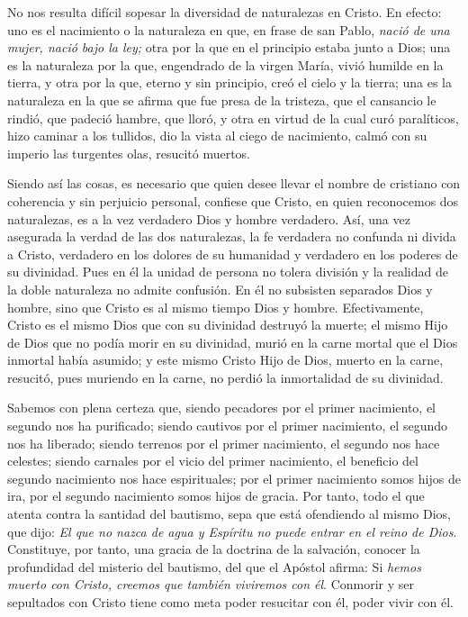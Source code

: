 				\begin{body}
					No nos resulta difícil sopesar la diversidad de naturalezas en Cristo. En efecto: uno es el nacimiento o la naturaleza en que, en frase de san Pablo, \emph{nació de una mujer, nació bajo la ley;} otra por la que en el principio estaba junto a Dios; una es la naturaleza por la que, engendrado de la virgen María, vivió humilde en la tierra, y otra por la que, eterno y sin principio, creó el cielo y la tierra; una es la naturaleza en la que se afirma que fue presa de la tristeza, que el cansancio le rindió, que padeció hambre, que lloró, y otra en virtud de la cual curó paralíticos, hizo caminar a los tullidos, dio la vista al ciego de nacimiento, calmó con su imperio las turgentes olas, resucitó muertos.
							
					Siendo así las cosas, es necesario que quien desee llevar el nombre de cristiano con coherencia y sin perjuicio personal, confiese que Cristo, en quien reconocemos dos naturalezas, es a la vez verdadero Dios y hombre verdadero. Así, una vez asegurada la verdad de las dos naturalezas, la fe verdadera no confunda ni divida a Cristo, verdadero en los dolores de su humanidad y verdadero en los poderes de su divinidad. Pues en él la unidad de persona no tolera división y la realidad de la doble naturaleza no admite confusión. En él no subsisten separados Dios y hombre, sino que Cristo es al mismo tiempo Dios y hombre. Efectivamente, Cristo es el mismo Dios que con su divinidad destruyó la muerte; el mismo Hijo de Dios que no podía morir en su divinidad, murió en la carne mortal que el Dios inmortal había asumido; y este mismo Cristo Hijo de Dios, muerto en la carne, resucitó, pues muriendo en la carne, no perdió la inmortalidad de su divinidad.
							
					Sabemos con plena certeza que, siendo pecadores por el primer nacimiento, el segundo nos ha purificado; siendo cautivos por el primer nacimiento, el segundo nos ha liberado; siendo terrenos por el primer nacimiento, el segundo nos hace celestes; siendo carnales por el vicio del primer nacimiento, el beneficio del segundo nacimiento nos hace espirituales; por el primer nacimiento somos hijos de ira, por el segundo nacimiento somos hijos de gracia. Por tanto, todo el que atenta contra la santidad del bautismo, sepa que está ofendiendo al mismo Dios, que dijo: \emph{El que no nazca de agua y Espíritu no puede entrar en el reino de Dios}. Constituye, por tanto, una gracia de la doctrina de la salvación, conocer la profundidad del misterio del bautismo, del que el Apóstol afirma: Si \emph{hemos muerto con Cristo, creemos que también viviremos con él}. Conmorir y ser sepultados con Cristo tiene como meta poder resucitar con él, poder vivir con él.
				\end{body}
			
